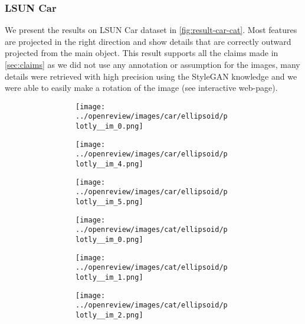 \subsubsection{LSUN Car}
We present the results on LSUN Car dataset in \autoref{fig:result-car-cat}. Most features are projected in the right direction and show details that are correctly outward projected from the main object. This result supports all the claims made in \autoref{sec:claims} as we did not use any annotation or assumption for the images, many details were retrieved with high precision using the StyleGAN knowledge and we were able to easily make a rotation of the image (see interactive web-page).
\begin{figure}[h]
    \centering
    \begin{subfigure}{0.80\textwidth}
    \begin{subfigure}{0.16\textwidth}
        \centering
        \texttt{[image: ../openreview/images/car/ellipsoid/plotly\_\_im\_0.png]}
    \end{subfigure}
    \begin{subfigure}{0.16\textwidth}
        \centering
        \texttt{[image: ../openreview/images/car/ellipsoid/plotly\_\_im\_4.png]}
    \end{subfigure}
    \begin{subfigure}{0.16\textwidth}
        \centering
        \texttt{[image: ../openreview/images/car/ellipsoid/plotly\_\_im\_5.png]}
    \end{subfigure}
    \begin{subfigure}{0.16\textwidth}
        \centering
        \texttt{[image: ../openreview/images/cat/ellipsoid/plotly\_\_im\_0.png]}
    \end{subfigure}
    \begin{subfigure}{0.16\textwidth}
        \centering
        \texttt{[image: ../openreview/images/cat/ellipsoid/plotly\_\_im\_1.png]}
    \end{subfigure}
    \begin{subfigure}{0.16\textwidth}
        \centering
        \texttt{[image: ../openreview/images/cat/ellipsoid/plotly\_\_im\_2.png]}
    \end{subfigure}
    

\end{subfigure}
\end{figure}
